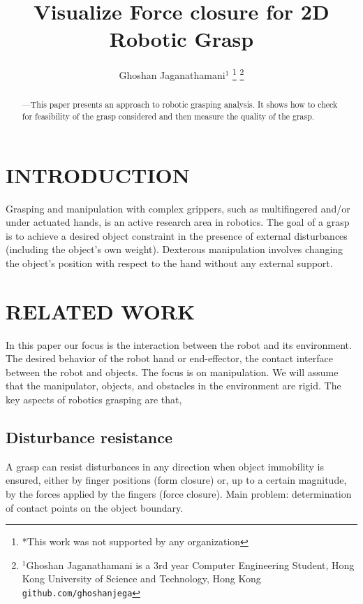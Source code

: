 \documentclass[letterpaper, 10 pt, conference]{ieeeconf}
\title{\LARGE \bf
    Visualize Force closure for 2D Robotic Grasp
    }
\author{Ghoshan Jaganathamani$^{1}$%
    \thanks{*This work was not supported by any organization}%
    \thanks{$^{1}$Ghoshan Jaganathamani is a 3rd year Computer Engineering Student,
            Hong Kong University of Science and Technology, Hong Kong
            {\tt\small github.com/ghoshanjega}}%
    }
\begin{document}
    
    
    
    \maketitle
    \thispagestyle{empty}
    \pagestyle{empty}
    
    
    \begin{abstract}
    
    —This paper presents an approach to robotic grasping analysis. It shows how to check for feasibility of the grasp considered and then measure the quality of the grasp.
    
    \end{abstract}
    
    
    \section{INTRODUCTION}
    
        Grasping and manipulation with complex grippers, such as multifingered and/or under actuated hands, is an active research area in robotics. The goal of a grasp is to achieve a desired object constraint in the presence of external disturbances (including the object’s own weight). Dexterous manipulation involves changing the object’s position with respect to the hand without any external support.
    
    \section{RELATED WORK}
    In this paper our focus is the interaction between the robot and its environment. The desired behavior of the robot
    hand or end-effector, the contact interface between
    the robot and objects. The focus is on manipulation. We will assume
    that the manipulator, objects, and obstacles in the environment are rigid. The key aspects of robotics grasping are that,
    \subsection{Disturbance resistance}
    
     A grasp can resist disturbances in any direction when object immobility is ensured, either by finger positions (form closure) or, up to a certain magnitude, by the forces applied by the fingers (force closure). Main problem: determination of contact points on the object boundary.
    
\end{document}
